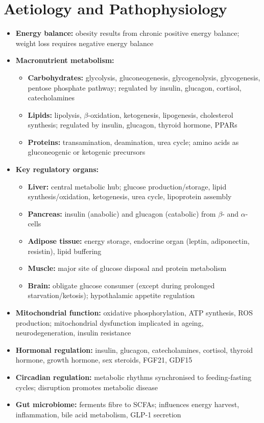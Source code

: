 \section*{Aetiology and Pathophysiology}
\begin{itemize}
    \item \textbf{Energy balance:} obesity results from chronic positive energy balance; weight loss requires negative energy balance
    \item \textbf{Macronutrient metabolism:}
    \begin{itemize}
        \item \textbf{Carbohydrates:} glycolysis, gluconeogenesis, glycogenolysis, glycogenesis, pentose phosphate pathway; regulated by insulin, glucagon, cortisol, catecholamines
        \item \textbf{Lipids:} lipolysis, $\beta$-oxidation, ketogenesis, lipogenesis, cholesterol synthesis; regulated by insulin, glucagon, thyroid hormone, PPARs
        \item \textbf{Proteins:} transamination, deamination, urea cycle; amino acids as gluconeogenic or ketogenic precursors
    \end{itemize}
    \item \textbf{Key regulatory organs:}
    \begin{itemize}
        \item \textbf{Liver:} central metabolic hub; glucose production/storage, lipid synthesis/oxidation, ketogenesis, urea cycle, lipoprotein assembly
        \item \textbf{Pancreas:} insulin (anabolic) and glucagon (catabolic) from $\beta$- and $\alpha$-cells
        \item \textbf{Adipose tissue:} energy storage, endocrine organ (leptin, adiponectin, resistin), lipid buffering
        \item \textbf{Muscle:} major site of glucose disposal and protein metabolism
        \item \textbf{Brain:} obligate glucose consumer (except during prolonged starvation/ketosis); hypothalamic appetite regulation
    \end{itemize}
    \item \textbf{Mitochondrial function:} oxidative phosphorylation, ATP synthesis, ROS production; mitochondrial dysfunction implicated in ageing, neurodegeneration, insulin resistance
    \item \textbf{Hormonal regulation:} insulin, glucagon, catecholamines, cortisol, thyroid hormone, growth hormone, sex steroids, FGF21, GDF15
    \item \textbf{Circadian regulation:} metabolic rhythms synchronised to feeding-fasting cycles; disruption promotes metabolic disease
    \item \textbf{Gut microbiome:} ferments fibre to SCFAs; influences energy harvest, inflammation, bile acid metabolism, GLP-1 secretion
\end{itemize}

